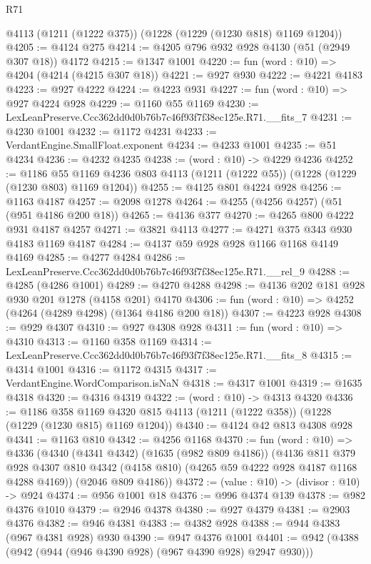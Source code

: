 \begin{lexlean}{R71}
\begin{coremodule}
    @4113
    (@1211 (@1222 @375))
    (@1228 (@1229 (@1230 @818) @1169 @1204))
@4205 := @4124 @275
@4214 := @4205 @796 @932 @928 @4130 (@51 (@2949 @307 @18)) @4172
@4215 := @1347 @1001
@4220 := fun (word : @10) => @4204 (@4214 (@4215 @307 @18))
@4221 := @927 @930
@4222 := @4221 @4183
@4223 := @927 @4222
@4224 := @4223 @931
@4227 := fun (word : @10) => @927 @4224 @928
@4229 := @1160 @55 @1169
@4230 := LexLeanPreserve.Ccc362dd0d0b76b7c46f93f7f38ec125e.R71.__fits_7
@4231 := @4230 @1001
@4232 := @1172 @4231
@4233 := VerdantEngine.SmallFloat.exponent
@4234 := @4233 @1001
@4235 := @51 @4234
@4236 := @4232 @4235
@4238 := (word : @10) -> @4229 @4236
@4252 := @1186
    @55
    @1169
    @4236
    @803
    @4113
    (@1211 (@1222 @55))
    (@1228 (@1229 (@1230 @803) @1169 @1204))
@4255 := @4125 @801 @4224 @928
@4256 := @1163 @4187
@4257 := @2098 @1278
@4264 := @4255 (@4256 @4257) (@51 (@951 @4186 @200 @18))
@4265 := @4136 @377
@4270 := @4265 @800 @4222 @931 @4187 @4257
@4271 := @3821 @4113
@4277 := @4271 @375 @343 @930 @4183 @1169 @4187
@4284 := @4137 @59 @928 @928 @1166 @1168 @4149 @4169
@4285 := @4277 @4284
@4286 := LexLeanPreserve.Ccc362dd0d0b76b7c46f93f7f38ec125e.R71.__rel_9
@4288 := @4285 (@4286 @1001)
@4289 := @4270 @4288
@4298 := @4136 @202 @181 @928 @930 @201 @1278 (@4158 @201) @4170
@4306 := fun (word : @10) => @4252 (@4264 (@4289 @4298) (@1364 @4186 @200 @18))
@4307 := @4223 @928
@4308 := @929 @4307
@4310 := @927 @4308 @928
@4311 := fun (word : @10) => @4310
@4313 := @1160 @358 @1169
@4314 := LexLeanPreserve.Ccc362dd0d0b76b7c46f93f7f38ec125e.R71.__fits_8
@4315 := @4314 @1001
@4316 := @1172 @4315
@4317 := VerdantEngine.WordComparison.isNaN
@4318 := @4317 @1001
@4319 := @1635 @4318
@4320 := @4316 @4319
@4322 := (word : @10) -> @4313 @4320
@4336 := @1186
    @358
    @1169
    @4320
    @815
    @4113
    (@1211 (@1222 @358))
    (@1228 (@1229 (@1230 @815) @1169 @1204))
@4340 := @4124 @42 @813 @4308 @928
@4341 := @1163 @810
@4342 := @4256 @1168
@4370 := fun (word : @10) =>
  @4336
    (@4340
      (@4341 @4342)
      (@1635 (@982 @809 @4186))
      (@4136
        @811
        @379
        @928
        @4307
        @810
        @4342
        (@4158 @810)
        (@4265 @59 @4222 @928 @4187 @1168 @4288 @4169))
      (@2046 @809 @4186))
@4372 := (value : @10) -> (divisor : @10) -> @924
@4374 := @956 @1001 @18
@4376 := @996 @4374 @139
@4378 := @982 @4376 @1010
@4379 := @2946 @4378
@4380 := @927 @4379
@4381 := @2903 @4376
@4382 := @946 @4381
@4383 := @4382 @928
@4388 := @944 @4383 (@967 @4381 @928) @930
@4390 := @947 @4376 @1001
@4401 := @942 (@4388 (@942 (@944 (@946 @4390 @928) (@967 @4390 @928) @2947 @930)))

\end{coremodule}
\end{lexlean}
